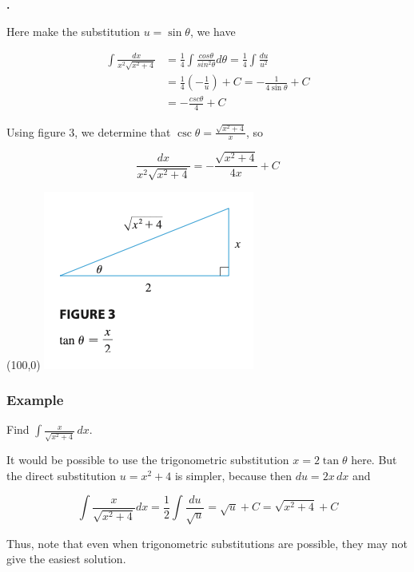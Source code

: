 \documentclass[t]{beamer}
\theoremstyle{plain}
\theoremstyle{definition}
\newcommand{\dx}{\,dx}
\newcounter{heading}
\newcommand{\newhead}[1]{\medskip\stepcounter{heading}\noindent\textbf{\hspace{0.2cm}{#1}.}}
\begin{document}
\begin{frame}

\newhead{Continued...}

Here make the substitution $u = \sin\theta$, we have

\begin{align*}
\int \frac{dx}{x^2\sqrt{x^2 + 4}} &= \frac{1}{4}\int \frac{cos\theta}{sin^2\theta} d\theta = \frac{1}{4}\int \frac{du}{u^2}\\
&= \frac{1}{4} \left(-\frac{1}{u}\right) + C = -\frac{1}{4\sin\theta} + C\\
&= -\frac{csc\theta}{4} + C
\end{align*}

Using figure 3, we determine that $\csc\theta = \frac{\sqrt{x^2 + 4}}{x}$, so

$$\frac{dx}{x^2\sqrt{x^2 + 4}} = -\frac{\sqrt{x^2 + 4}}{4x} + C$$

\begin{textblock}{0.3}(100,0)
      \includegraphics[scale=0.6]{fig/csc}
\end{textblock}


\end{frame}



\begin{frame}

\frametitle{Example} 

Find $\int\frac{x}{\sqrt{x^{2}+4}}\,dx$. \pause

\medskip

It would be possible to use the trigonometric substitution $x = 2\tan\theta$ here.  But the direct substitution $u = x^2 + 4$ is simpler, because then $du = 2x\dx$ and

$$\int\frac{x}{\sqrt{x^2 + 4}}dx = \frac{1}{2}\int\frac{du}{\sqrt{u}} = \sqrt{u} + C = \sqrt{x^2 + 4} + C$$

Thus, note that even when trigonometric substitutions are possible, they may not give the easiest solution.

\end{frame}
\end{document}
